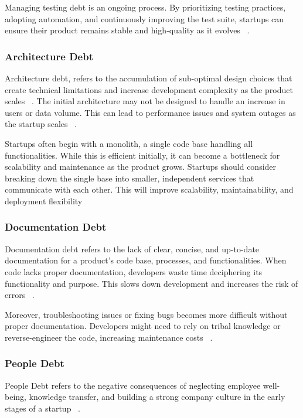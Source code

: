 \documentclass[manuscript]{acmart}
\begin{document}
Managing testing debt is an ongoing process. By prioritizing testing practices, adopting automation, and continuously improving the test suite, startups can ensure their product remains stable and high-quality as it evolves ~\cite{CrowneWhyStartupsFail, 1NewMess49:online}.

\subsubsection{Architecture Debt}
Architecture debt, refers to the accumulation of sub-optimal design choices that create technical limitations and increase development complexity as the product scales ~\cite{Startups4:online}. The initial architecture may not be designed to handle an increase in users or data volume. This can lead to performance issues and system outages as the startup scales ~\cite{Qualityv77:online}.

Startups often begin with a monolith, a single code base handling all functionalities. While this is efficient initially, it can become a bottleneck for scalability and maintenance as the product grows. Startups should consider breaking down the single base into smaller, independent services that communicate with each other. This will improve scalability, maintainability, and deployment flexibility ~\cite{Howtohan98:online, DesignSt86:online}

\subsubsection{Documentation Debt}
Documentation debt refers to the lack of clear, concise, and up-to-date documentation for a product's code base, processes, and functionalities. When code lacks proper documentation, developers waste time deciphering its functionality and purpose. This slows down development and increases the risk of errors ~\cite{The3Best94:online, 10.1145/3493244.3493254}.

Moreover, troubleshooting issues or fixing bugs becomes more difficult without proper documentation. Developers might need to rely on tribal knowledge or reverse-engineer the code, increasing maintenance costs ~\cite{DesignSt86:online}.

\subsubsection{People Debt}
People Debt refers to the negative consequences of neglecting employee well-being, knowledge transfer, and building a strong company culture in the early stages of a startup ~\cite{Blog21:online}. 
\end{document}
